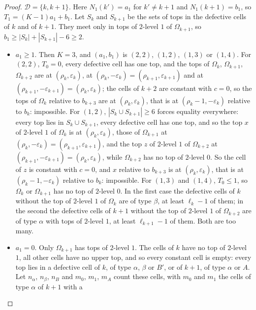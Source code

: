 \begin{proof}
\enlargethispage{\baselineskip}\emph{$\mathcal D=\{k,k+1\}$.} Here $N_{1}(k')=a_{1}$ for $k'\ne k+1$ and
$N_{1}(k+1)=b_{1}$, so $T_{1}=(K-1)a_{1}+b_{1}$. Let $S_{k}$ and $S_{k+1}$
be the sets of tops in the defective cells of $k$ and of $k+1$. They meet only
in tops of $2$-level $1$ of $\Omega_{k+1}$, so $b_{1}\ge|S_{k}|+|S_{k+1}|-6
\ge2$.
\begin{itemize}
\item $a_{1}\ge1$. Then $K=3$, and $(a_{1},b_{1})$ is $(2,2)$, $(1,2)$, $(1,3)$
or $(1,4)$. For $(2,2)$, $T_{0}=0$, every defective cell has one top, and the
tops of $\Omega_{k}$, $\Omega_{k+1}$, $\Omega_{k+2}$ are at
$(\rho_{k},\varepsilon_{k})$, at $(\rho_{k},-\varepsilon_{k})=(\rho_{k+1},
\varepsilon_{k+1})$ and at $(\rho_{k+1},-\varepsilon_{k+1})=(\rho_{k},
\varepsilon_{k})$; the cells of $k+2$ are constant with $c=0$, so the tops
of $\Omega_{k}$ relative to $b_{k+3}$ are at $(\rho_{k},\varepsilon_{k})$,
that is at $(\rho_{k}-1,-\varepsilon_{k})$ relative to $b_{k}$: impossible.
For $(1,2)$, $|S_{k}\cup S_{k+1}|\ge6$ forces equality everywhere: every top
lies in $S_{k}\cup S_{k+1}$, every defective cell has one top, and so the top
$x$ of $2$-level $1$ of $\Omega_{k}$ is at $(\rho_{k},\varepsilon_{k})$, those
of $\Omega_{k+1}$ at $(\rho_{k},-\varepsilon_{k})=(\rho_{k+1},
\varepsilon_{k+1})$, and the top $z$ of $2$-level $1$ of $\Omega_{k+2}$ at
$(\rho_{k+1},-\varepsilon_{k+1})=(\rho_{k},\varepsilon_{k})$, while
$\Omega_{k+2}$ has no top of $2$-level $0$. So the cell of $z$ is constant with
$c=0$, and $x$ relative to $b_{k+3}$ is at $(\rho_{k},\varepsilon_{k})$, that
is at $(\rho_{k}-1,-\varepsilon_{k})$ relative to $b_{k}$: impossible. For
$(1,3)$ and $(1,4)$, $T_{0}\le1$, so $\Omega_{k}$ or $\Omega_{k+1}$ has no
top of $2$-level $0$. In the first case the defective cells of $k$ without
the top of $2$-level $1$ of $\Omega_{k}$ are of type $\beta$, at least
$\ell_{k}-1$ of them; in the second the defective cells of $k+1$ without
the top of $2$-level $1$ of $\Omega_{k+2}$ are of type $\alpha$ with tops of
$2$-level $1$, at least $\ell_{k+1}-1$ of them. Both are too many.
\item $a_{1}=0$. Only $\Omega_{k+1}$ has tops of $2$-level $1$. The cells of
$k$ have no top of $2$-level $1$, all other cells have no upper top, and so
every constant cell is empty: every top lies in a defective cell of $k$, of
type $\alpha$, $\beta$ or $B'$, or of $k+1$, of type $\alpha$ or $A$. Let
$n_{\alpha}$, $n_{\beta}$, $n_{B}$ and $m_{0}$, $m_{1}$, $m_{A}$ count these
cells, with $m_{0}$ and $m_{1}$ the cells of type $\alpha$ of $k+1$ with a

\end{itemize}
\end{proof}
